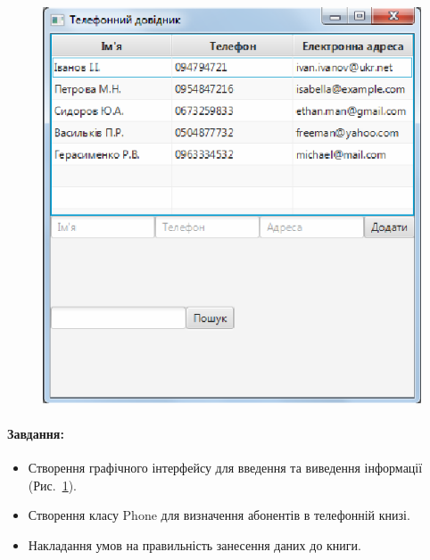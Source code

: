 \begin{figure}[h]
	\includegraphics{chapter16/images/image1.png}
	\caption{}
	\label{fig16:image1}
\end{figure}

\paragraph{Завдання:}
\begin{itemize}
	\item Створення графічного інтерфейсу для введення та виведення інформації (Рис.~\ref{fig16:image1}).
	\item Створення класу Phone для визначення абонентів  в телефонній книзі.
	\item Накладання умов на правильність занесення даних до книги.
\end{itemize}

